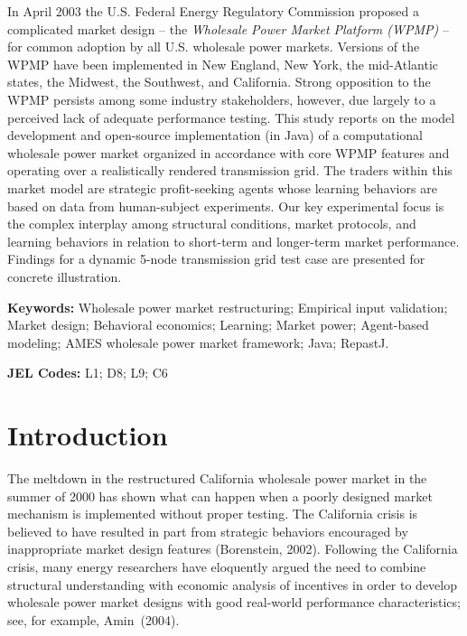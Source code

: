 \documentclass[12pt]{article}
\begin{document}
\noindent
In April 2003 the U.S. Federal Energy Regulatory Commission proposed a complicated market design -- the \textit{Wholesale Power Market Platform (WPMP)} -- for common adoption by all U.S. wholesale power markets.  Versions of the WPMP have been implemented in New England, New York, the mid-Atlantic states, the Midwest, the Southwest, and California. Strong opposition to the WPMP persists among some industry stakeholders, however, due largely to a perceived lack of adequate performance testing. This study reports on the model development and open-source implementation (in Java) of a computational wholesale power market organized in accordance with core WPMP features and operating over a realistically rendered transmission grid.  The traders within this market model are strategic profit-seeking agents whose learning behaviors are based on data from human-subject experiments.  Our key experimental focus is the complex interplay among structural conditions, market protocols, and learning behaviors in relation to short-term and longer-term market performance.  Findings for a dynamic 5-node transmission grid test case are presented for concrete illustration.   


\bigskip
\noindent \textbf{Keywords:} Wholesale power market restructuring; Empirical input validation; Market design; Behavioral economics; Learning; Market power; Agent-based modeling; AMES wholesale power market framework; Java; RepastJ.

\medskip 
\noindent 
\textbf{JEL Codes:} L1; D8; L9; C6

\vfill
      
\pagebreak
                
\section{Introduction}

\smallskip

\noindent 
The meltdown in the restructured California wholesale power market in the summer of 2000 has shown what can happen when a poorly designed market mechanism is implemented without proper testing.  The California crisis is believed to have resulted in part from strategic behaviors encouraged by inappropriate market design features (Borenstein, 2002).  Following the California crisis, many energy researchers have eloquently argued the need to combine structural understanding with economic analysis of incentives in order to develop wholesale power market designs with good real-world performance characteristics; see, for example, Amin~(2004).  
\end{document}
